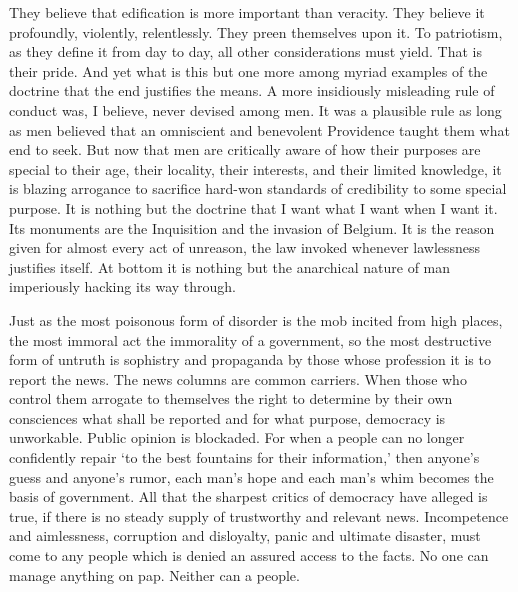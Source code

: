 \documentclass[openany,nobib,twoside,nohyper]{tufte-book}
\begin{document}
They believe that edification is more important than veracity. They
believe it profoundly, violently, relentlessly. They preen themselves
upon it. To patriotism, as they define it from day to day, all other
considerations must yield. That is their pride. And yet what is this but
one more among myriad examples of the doctrine that the end justifies
the means. A more insidiously misleading rule of conduct was, I believe,
never devised among men. It was a plausible rule as long as men believed
that an omniscient and benevolent Providence taught them what end to
seek. But now that men are critically aware of how their purposes are
special to their age, their locality, their interests, and their limited
knowledge, it is blazing arrogance to sacrifice hard-won standards of
credibility to some special purpose. It is nothing but the doctrine that
I want what I want when I want it. Its monuments are the Inquisition and
the invasion of Belgium. It is the reason given for almost every act of
unreason, the law invoked whenever lawlessness justifies itself. At
bottom it is nothing but the anarchical nature of man imperiously
hacking its way through.

Just as the most poisonous form of disorder is the mob incited from high
places, the most immoral act the immorality of a government, so the most
destructive form of untruth is sophistry and propaganda by those whose
profession it is to report the news. The news columns are common
carriers. When those who control them arrogate to themselves the right
to determine by their own consciences what shall be reported and for
what purpose, democracy is unworkable. Public opinion is blockaded. For
when a people can no longer confidently repair `to the best fountains
for their information,' then anyone's guess and anyone's rumor, each
man's hope and each man's whim becomes the basis of government. All that
the sharpest critics of democracy have alleged is true, if there is no
steady supply of trustworthy and relevant news. Incompetence and
aimlessness, corruption and disloyalty, panic and ultimate disaster,
must come to any people which is denied an assured access to the facts.
No one can manage anything on pap. Neither can a people.
\end{document}

